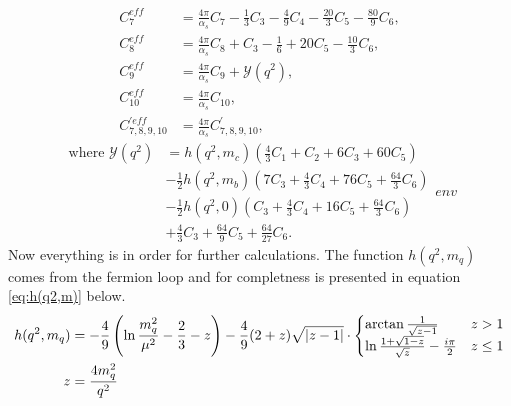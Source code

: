 \documentclass[english]{uzhpub}
\begin{document}
\begin{equation}
 \begin{split}
  C_7^{eff} &= \frac{4 \pi}{\alpha_s} C_7 - \frac{1}{3} C_3 - \frac{4}{9} C_4 - \frac{20}{3} C_5 - \frac{80}{9} C_6, \\
  C_8^{eff} &= \frac{4 \pi}{\alpha_s} C_8 + C_3 - \frac{1}{6} + 20 C_5 - \frac{10}{3} C_6 , \\
  C_9^{eff} &= \frac{4\pi}{\alpha_s} C_9 + \mathcal{Y}(q^2), \\
  C_{10}^{eff} &= \frac{4 \pi}{\alpha_s} C_{10}, \\
  C_{7,8,9,10}^{\prime eff} &= \frac{4 \pi}{\alpha_s} C_{7,8,9,10}^{\prime},
 \end{split}
\end{equation}
\begin{equation}
 \begin{split}
  \text{where   } \mathcal{Y} (q^2) &= h(q^2,m_c) \left( \frac{4}{3}C_1 + C_2 + 6C_3 + 60C_5 \right) \\
  &- \frac{1}{2} h(q^2,m_b) \left(7C_3 + \frac{4}{3}C_4 + 76C_5 + \frac{64}{3} C_6  \right) \\
  &- \frac{1}{2} h(q^2,0) \left( C_3 + \frac{4}{3}C_4 + 16C_5 + \frac{64}{3} C_6 \right) \\
  &+ \frac{4}{3} C_3 + \frac{64}{9} C_5 + \frac{64}{27} C_6 .
 \end{split}env
\end{equation}
Now everything is in order for further calculations. The function $h(q^2,m_q)$ comes from the fermion loop and for completness is presented in equation \ref{eq:h(q2,m)} below.
\begin{align}
 h(q^2,m_q)                                            & = - \frac{4}{9} \left(\ln{\frac{m_q^2}{\mu^2}} - \frac{2}{3} - z \right) - \frac{4}{9}(2+z) \sqrt{|z-1|}  \cdot  \begin{cases}
 \arctan{\frac{1}{\sqrt{z-1}}}                         & z > 1                                                                                                                          \\
 \ln{\frac{1+ \sqrt{1-z}}{\sqrt{z}}} - \frac{i \pi}{2} & z \leq 1
 \end{cases}
 \label{eq:h(q2,m)} \\
 \notag z                                              & = \frac{4m_q^2}{q^2}
\end{align}
\end{document}
